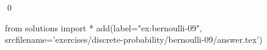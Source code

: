 
\begin{ex} 
  \label{ex:bernoulli-09}
  
  \qed
\end{ex} 
\begin{python0}
from solutions import *
add(label="ex:bernoulli-09",
    srcfilename='exercises/discrete-probability/bernoulli-09/answer.tex') 
\end{python0}
